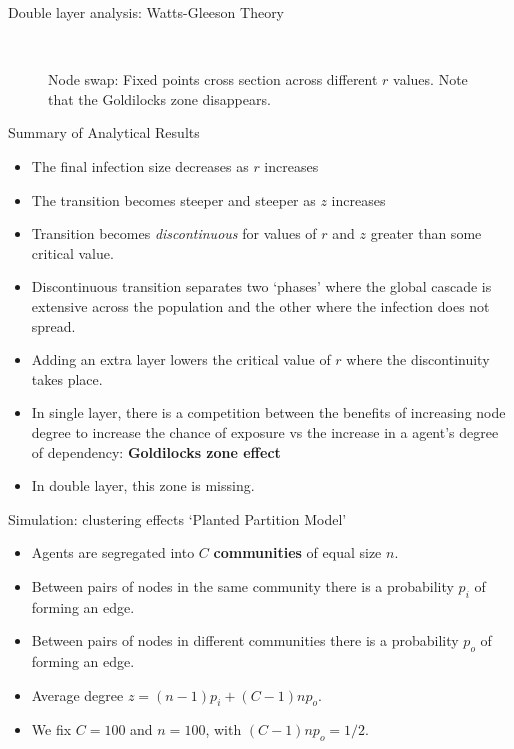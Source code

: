 \documentclass[10pt, xcolor=dvipsnames, handout]{beamer}
\begin{document}
\begin{frame}{Double layer analysis: Watts-Gleeson Theory}
\begin{figure}
\begin{subfigure}[b]{0.4\textwidth}
    \end{subfigure}
    ~
    \caption{Node swap: Fixed points cross section across different $r$ values. Note that the Goldilocks zone disappears. }
\end{figure}
\end{frame}

\begin{frame}{Summary of Analytical Results}
\begin{itemize}
\pause \item The final infection size decreases as $r$ increases
\pause \item The transition becomes steeper and steeper as $z$ increases
\pause \item Transition becomes \emph{discontinuous} for values of $r$ and $z$ greater than some critical value.
\pause \item Discontinuous transition separates two `phases' where the global cascade is extensive across the population and the other where the infection does not spread.
\pause \item Adding an extra layer lowers the critical value of $r$ where the discontinuity takes place.
\pause \item In single layer, there is a competition between the benefits of increasing node degree to increase the chance of exposure vs the increase in a agent's degree of dependency: \textbf{Goldilocks zone effect}
\pause \item In double layer, this zone is missing.
\end{itemize}
\end{frame}

\begin{frame}{Simulation: clustering effects}
`Planted Partition Model'
\begin{itemize}
\item Agents are segregated into $C$ \textbf{communities} of equal size $n$.
\pause \item Between pairs of nodes in the same community there is a probability $p_i$ of forming an edge.
\pause \item Between pairs of nodes in different communities there is a probability $p_o$ of forming an edge.
\pause \item Average degree $z = (n-1)p_i + (C-1)np_o$.
\pause \item We fix $C=100$ and $n=100$, with $(C-1)np_o = 1/2$.
\end{itemize}
\end{frame}
\end{document}
